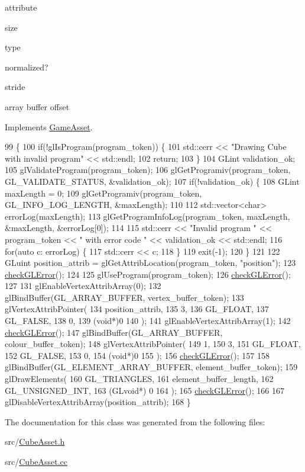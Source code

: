 attribute

size

type

normalized?

stride

array buffer offset 

Implements \hyperlink{classGameAsset_a961aa51ca0a9961fc584c0b5d5431300}{Game\+Asset}.


\begin{DoxyCode}
99                                          \{
100   \textcolor{keywordflow}{if}(!glIsProgram(program\_token)) \{
101     std::cerr << \textcolor{stringliteral}{"Drawing Cube with invalid program"} << std::endl;
102     \textcolor{keywordflow}{return};
103   \}
104   GLint validation\_ok;
105   glValidateProgram(program\_token);
106   glGetProgramiv(program\_token, GL\_VALIDATE\_STATUS, &validation\_ok);
107   \textcolor{keywordflow}{if}(!validation\_ok) \{
108     GLint maxLength = 0;
109     glGetProgramiv(program\_token, GL\_INFO\_LOG\_LENGTH, &maxLength);
110 
112     std::vector<char> errorLog(maxLength);
113     glGetProgramInfoLog(program\_token, maxLength, &maxLength, &errorLog[0]);
114 
115     std::cerr << \textcolor{stringliteral}{"Invalid program "} << program\_token << \textcolor{stringliteral}{" with error code "} << validation\_ok << std::endl;
116     \textcolor{keywordflow}{for}(\textcolor{keyword}{auto} c: errorLog) \{
117       std::cerr << c;
118     \}
119     exit(-1);
120   \}
121 
122   GLuint position\_attrib = glGetAttribLocation(program\_token, \textcolor{stringliteral}{"position"});
123   \hyperlink{CubeAsset_8cc_a75f201b0e53e68726854997957322b8d}{checkGLError}();
124 
125   glUseProgram(program\_token);
126   \hyperlink{CubeAsset_8cc_a75f201b0e53e68726854997957322b8d}{checkGLError}();
127 
131   glEnableVertexAttribArray(0);
132   glBindBuffer(GL\_ARRAY\_BUFFER, vertex\_buffer\_token);
133   glVertexAttribPointer(
134     position\_attrib,        
135     3,        
136     GL\_FLOAT,   
137     GL\_FALSE,   
138     0,        
139     (\textcolor{keywordtype}{void}*)0    
140   );
141   glEnableVertexAttribArray(1);
142   \hyperlink{CubeAsset_8cc_a75f201b0e53e68726854997957322b8d}{checkGLError}();
147   glBindBuffer(GL\_ARRAY\_BUFFER, colour\_buffer\_token);
148   glVertexAttribPointer(
149     1,        
150     3,        
151     GL\_FLOAT,   
152     GL\_FALSE,   
153     0,        
154     (\textcolor{keywordtype}{void}*)0    
155   );
156   \hyperlink{CubeAsset_8cc_a75f201b0e53e68726854997957322b8d}{checkGLError}();
157 
158   glBindBuffer(GL\_ELEMENT\_ARRAY\_BUFFER, element\_buffer\_token);
159   glDrawElements(
160     GL\_TRIANGLES,
161     element\_buffer\_length,
162     GL\_UNSIGNED\_INT,
163     (GLvoid*) 0
164   );
165   \hyperlink{CubeAsset_8cc_a75f201b0e53e68726854997957322b8d}{checkGLError}();
166 
167   glDisableVertexAttribArray(position\_attrib);
168 \}
\end{DoxyCode}


The documentation for this class was generated from the following files\+:\begin{DoxyCompactItemize}
\item 
src/\hyperlink{CubeAsset_8h}{Cube\+Asset.\+h}\item 
src/\hyperlink{CubeAsset_8cc}{Cube\+Asset.\+cc}\end{DoxyCompactItemize}
